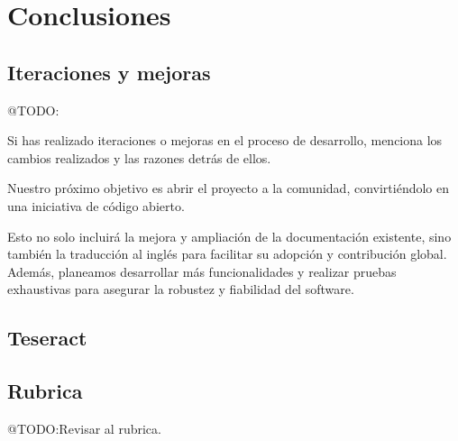 \chapter{Conclusiones}\label{ch:chapter_6}


\section{Iteraciones y mejoras}
\colorbox{color_highlight}{@TODO:}

Si has realizado iteraciones o mejoras en el proceso de desarrollo, menciona los cambios realizados y las razones detrás
de ellos.

Nuestro próximo objetivo es abrir el proyecto a la comunidad, convirtiéndolo en una iniciativa de código abierto.

Esto no solo incluirá la mejora y ampliación de la documentación existente, sino también la traducción al inglés para
facilitar su adopción y contribución global.
Además, planeamos desarrollar más funcionalidades y realizar pruebas exhaustivas para asegurar la robustez y fiabilidad
del software.


\section{Teseract}

\section{Rubrica}
\colorbox{color_highlight}{@TODO:Revisar al rubrica.}

